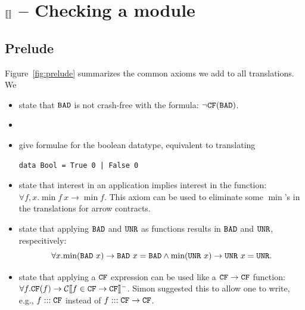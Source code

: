 \documentclass[preprint]{sigplanconf}
\begin{document}
\section{$\llbracket  \rrbracket$ -- Checking a module}

\subsection{Prelude}
Figure~\ref{fig:prelude} summarizes the common axioms we add to all
translations.  We 
\begin{itemize}
  \item state that $\texttt{BAD}$ is not crash-free with the formula:
$\lnot \texttt{CF}(\texttt{BAD})$.

  \item {}

  \item give formulae for the boolean datatype, equivalent to
translating
\begin{verbatim}
data Bool = True 0 | False 0
\end{verbatim}

  \item \designChoice state that interest in an application implies
  interest in the function: $\forall f,x. \min{f ~x} \to \min{f}$.  This axiom can
  be used to eliminate some $\min{}$'s in the translations for arrow contracts.

  \item \designChoice state that applying $\texttt{BAD}$ and $\texttt{UNR}$ as functions
  results in $\texttt{BAD}$ and $\texttt{UNR}$, respecitively: \[
  \forall x. \mbox{min}(\texttt{BAD} ~x) \to \texttt{BAD} ~x = \texttt{BAD} \land \mbox{min}(\texttt{UNR} ~x) \to \texttt{UNR} ~x = \texttt{UNR}.
  \]

  \item \designChoice state that applying a $\texttt{CF}$ expression can be used like a
  $\texttt{CF} \to \texttt{CF}$ function: $\forall f. \texttt{CF}(f) \to \mathcal{C} \llbracket f \in \texttt{CF} \to \texttt{CF} \rrbracket^-$.
  Simon suggested this to allow one to write, e.g., $f ::: \texttt{CF}$ instead of 
  $f ::: \texttt{CF} \to \texttt{CF}$.
\end{itemize}
\end{document}
